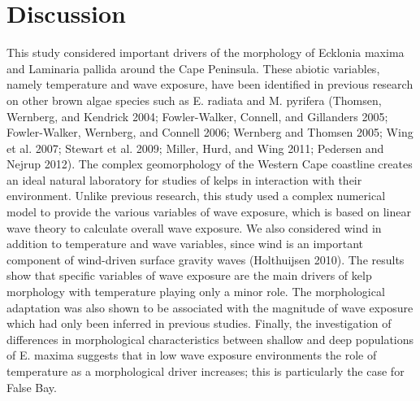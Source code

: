 \documentclass[
  a4paper,
]{article}
\begin{document}
\hypertarget{discussion}{%
\section{Discussion}\label{discussion}}

This study considered important drivers of the morphology of Ecklonia
maxima and Laminaria pallida around the Cape Peninsula. These abiotic
variables, namely temperature and wave exposure, have been identified in
previous research on other brown algae species such as E. radiata and M.
pyrifera (Thomsen, Wernberg, and Kendrick 2004; Fowler-Walker, Connell,
and Gillanders 2005; Fowler-Walker, Wernberg, and Connell 2006; Wernberg
and Thomsen 2005; Wing et al. 2007; Stewart et al. 2009; Miller, Hurd,
and Wing 2011; Pedersen and Nejrup 2012). The complex geomorphology of
the Western Cape coastline creates an ideal natural laboratory for
studies of kelps in interaction with their environment. Unlike previous
research, this study used a complex numerical model to provide the
various variables of wave exposure, which is based on linear wave theory
to calculate overall wave exposure. We also considered wind in addition
to temperature and wave variables, since wind is an important component
of wind-driven surface gravity waves (Holthuijsen 2010). The results
show that specific variables of wave exposure are the main drivers of
kelp morphology with temperature playing only a minor role. The
morphological adaptation was also shown to be associated with the
magnitude of wave exposure which had only been inferred in previous
studies. Finally, the investigation of differences in morphological
characteristics between shallow and deep populations of E. maxima
suggests that in low wave exposure environments the role of temperature
as a morphological driver increases; this is particularly the case for
False Bay.
\end{document}
